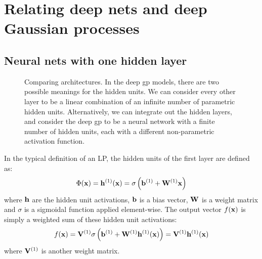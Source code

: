 \documentclass[twoside]{article}
\makeatletter
\newlength{\nonHumbleHeight}
\def\@humbleformat#1{{\settoheight{\nonHumbleHeight}{#1}\resizebox{!}{0.94\nonHumbleHeight}{#1}}}%
\def\humble#1{\@humbleformat{#1}}%
\newcommand{\gp}{{\humble GP}}
\newcommand{\gpt}{{\sc gp}}
\newcommand{\MLP}{{\humble MLP}}
\newcommand{\sectiondist}{}
\makeatother
\begin{document}
\section{Relating deep nets and deep Gaussian processes}
\label{sec:relating}
\sectiondist


\subsection{Neural nets with one hidden layer}

\begin{figure}

\caption{Comparing architectures.
In the deep \gpt{} models, there are two possible meanings for the hidden units.  
We can consider every other layer to be a linear combination of an infinite number of parametric hidden units. Alternatively, we can integrate out the hidden layers, and consider the deep \gpt{} to be a neural network with a finite number of hidden units, each with a different non-parametric activation function.}
\label{fig:architectures}
\end{figure}

In the typical definition of an \MLP{}, the hidden units of the first layer are defined as:
%
\begin{align}
\Phi({\bf{x}}) = {\bf{h}}^{(1)}({\bf{x}}) = \sigma \left( {\bf{b}}^{(1)} + \mathbf{W}^{(1)}{\bf{x}} \right)
\end{align}
%
where ${\bf{h}}$ are the hidden unit activations, ${\bf{b}}$ is a bias vector, $\mathbf{W}$ is a weight matrix and $\sigma$ is a sigmoidal function applied element-wise. The output vector $f({\bf{x}})$ is simply a weighted sum of these hidden unit activations:
%
\begin{align}
f({\bf{x}}) = \mathbf{V}^{(1)} \sigma \left( {\bf{b}}^{(1)} + \mathbf{W}^{(1)} {\bf{h}}^{(1)}({\bf{x}}) \right)  = \mathbf{V}^{(1)} {\bf{h}}^{(1)}({\bf{x}}) 
\end{align}
%
where $\mathbf{V}^{(1)}$ is another weight matrix.
\end{document}
